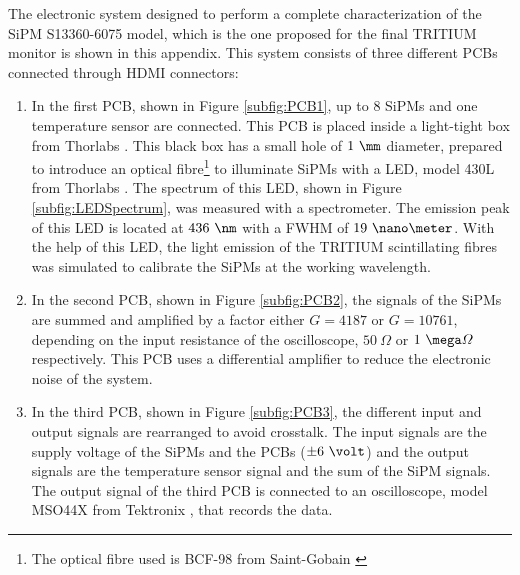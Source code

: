 The electronic system designed to perform a complete characterization of the SiPM S13360-6075 model, which is the one proposed for the final TRITIUM monitor is shown in this appendix. This system consists of three different PCBs connected through HDMI connectors:

\begin{enumerate}
\item{} In the first PCB, shown in Figure \ref{subfig:PCB1}, up to 8 SiPMs and one temperature sensor are connected. This PCB is placed inside a light-tight box from Thorlabs \cite{ThorlabsCompany}. This black box has a small hole of $1~\mm$ diameter, prepared to introduce an optical fibre\footnote{The optical fibre used is BCF-98 from Saint-Gobain \cite{OpticalFibers}} to illuminate SiPMs with a LED, model 430L from Thorlabs \cite{LEDThorlabs}. The spectrum of this LED, shown in Figure \ref{subfig:LEDSpectrum}, was measured with a spectrometer. The emission peak of this LED is located at $436~\nm$ with a FWHM of $19~\nano\meter$. With the help of this LED, the light emission of the TRITIUM scintillating fibres was simulated to calibrate the SiPMs at the working wavelength. 

\item{} In the second PCB, shown in Figure \ref{subfig:PCB2}, the signals of the SiPMs are summed and amplified by a factor either $G=4187$ or $G=10761$, depending on the input resistance of the oscilloscope, $50~\varOmega$ or $1~\mega\varOmega$ respectively. This PCB uses a differential amplifier to reduce the electronic noise of the system.

\item{} In the third PCB, shown in Figure \ref{subfig:PCB3}, the different input and output signals are rearranged to avoid crosstalk. The input signals are the supply voltage of the SiPMs and the PCBs ($\pm 6~\volt$) and the output signals are the temperature sensor signal and the sum of the SiPM signals. The output signal of the third PCB is connected to an oscilloscope, model MSO44X from Tektronix \cite{Oscilloscope}, that records the data.

\end{enumerate}

